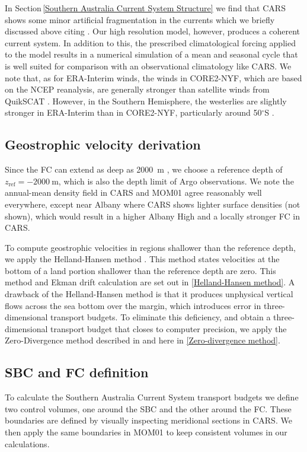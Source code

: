 \documentclass[preprint,3p,review,12pt]{elsarticle}
\newcommand{\dg}{$^{\circ}$}
\newcommand{\sub}[1]{_{\text{#1}}}
\begin{document}
In Section\,\ref{Southern Australia Current System Structure} we find that CARS shows some minor artificial fragmentation in the currents which we briefly discussed above citing \citet{Ridgway2002}. Our high resolution model, however, produces a coherent current system. In addition to this, the prescribed climatological forcing applied to the model results in a numerical simulation of a mean and seasonal cycle that is well suited for comparison with an observational climatology like CARS.
We note that, as for ERA-Interim winds, the winds in CORE2-NYF, which are based on the NCEP reanalysis, are generally stronger than satellite winds from QuikSCAT \citep{Large2009}. However, in the Southern Hemisphere, the westerlies are slightly stronger in ERA-Interim than in CORE2-NYF, particularly around 50\dg S \citep{Chaudhuri2013}.

\subsection{Geostrophic velocity derivation} \label{Geostrophic velocity derivation}
Since the FC can extend as deep as \SI{2000}{\meter} \citep{Middleton2002}, we choose a reference depth of $z\sub{ref} = \SI{-2000}{\meter}$, which is also the depth limit of Argo observations. We note the annual-mean density field in CARS and MOM01 agree reasonably well everywhere, except near Albany where CARS shows lighter surface densities (not shown), which would result in a higher Albany High and a locally stronger FC in CARS.

To compute geostrophic velocities in regions shallower than the reference depth, we apply the Helland-Hansen method \citep{Helland-Hansen1934,Fomin1964}. This method states velocities at the bottom of a land portion shallower than the reference depth are zero. This method and Ekman drift calculation are set out in \ref{Helland-Hansen method}. A drawback of the Helland-Hansen method is that it produces unphysical vertical flows across the sea bottom over the margin, which introduces error in three-dimensional transport budgets. To eliminate this deficiency, and obtain a three-dimensional transport budget that closes to computer precision, we apply the Zero-Divergence method described in \citet{Furue2017} and here in \ref{Zero-divergence method}.

\subsection{SBC and FC definition} \label{SBC and FC definition}
To calculate the Southern Australia Current System transport budgets we define two control volumes, one around the SBC and the other around the FC\@. These boundaries are defined by visually inspecting meridional sections in CARS. We then apply the same boundaries in MOM01 to keep consistent volumes in our calculations. 
\end{document}
